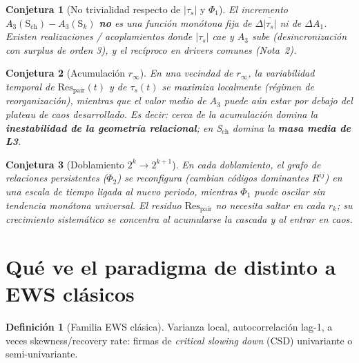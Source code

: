 \documentclass[11pt,a4paper]{article}
\theoremstyle{definition}
\newtheorem{definition}{Definici\'on}[section]
\theoremstyle{plain}
\newtheorem{conjecture}{Conjetura}[section]
\theoremstyle{remark}
\newcommand{\Res}{\mathrm{Res}}
\newcommand{\ts}{\tau_s}
\begin{document}
\begin{conjecture}[No trivialidad respecto de $|\ts|$ y $\Phi_1$]
\label{conj:nontriv}
El incremento $A_3(\mathrm{S}_{\mathrm{ch}})-A_3(\mathrm{S}_{k})$
\textbf{no} es una funci\'on mon\'otona fija de
$\Delta\overline{|\ts|}$ ni de $\Delta A_1$. Existen realizaciones /
acoplamientos donde $|\ts|$ cae y $A_3$ sube (desincronizaci\'on con
surplus de orden 3), y el rec\'iproco en drivers comunes (Nota~2).
\end{conjecture}

\begin{conjecture}[Acumulaci\'on $r_\infty$]
\label{conj:rinf}
En una vecindad de $r_\infty$, la \emph{variabilidad temporal} de
$\Res_{\mathrm{pair}}(t)$ y de $\ts(t)$ se maximiza localmente (r\'egimen
de reorganizaci\'on), mientras que el valor medio de $A_3$ puede a\'un
estar por debajo del plateau de caos desarrollado. Es decir: cerca de
la acumulaci\'on domina la \textbf{inestabilidad de la geometr\'ia
relacional}; en S$_{\mathrm{ch}}$ domina la \textbf{masa media de L3}.
\end{conjecture}

\begin{conjecture}[Doblamiento $2^k\to 2^{k+1}$]
\label{conj:doubling}
En cada doblamiento, el grafo de relaciones persistentes ($\Phi_2$) se
reconfigura (cambian c\'odigos dominantes $R^{ij}$) en una escala de
tiempo ligada al nuevo periodo, mientras $\Phi_1$ puede oscilar sin
tendencia mon\'otona universal. El residuo $\Res_{\mathrm{pair}}$ no
necesita saltar en cada $r_k$; su crecimiento sistem\'atico se concentra
al acumularse la cascada y al entrar en caos.
\end{conjecture}

\section{Qu\'e ve el paradigma de distinto a EWS cl\'asicos}
\label{sec:vs_ews}

\begin{definition}[Familia EWS cl\'asica]
\label{def:ews}
Varianza local, autocorrelaci\'on lag-1, a veces skewness/recovery rate:
firmas de \emph{critical slowing down} (CSD) univariante o
semi-univariante.
\end{definition}
\end{document}
